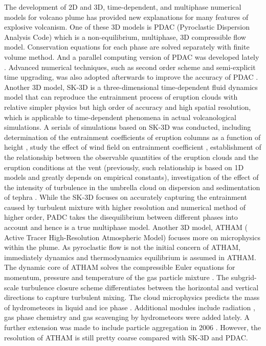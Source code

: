 \documentclass[journal abbreviation, manuscript]{copernicus}
\begin{document}
The development of 2D and 3D, time-dependent, and multiphase numerical models for volcano plume has provided new explanations for many features of explosive volcanism. One of these 3D models is PDAC (Pyroclastic Dispersion Analysis Code) \citep{neri2003multiparticle}  which is a non-equilibrium, multiphase, 3D compressible flow model. Conservation equations for each phase are solved separately with finite volume method. And a parallel computing version of PDAC was developed lately \citep{ongaro2007parallel}. Advanced numerical techniques, such as second order scheme and semi-explicit time upgrading, was also adopted afterwards to improve the accuracy of PDAC \citep{carcano2013semi}. 
Another 3D model, SK-3D \citep{suzuki2005numerical} is a three-dimensional time-dependent fluid dynamics model that can reproduce the entrainment process of eruption clouds with relative simpler physics but high order of accuracy and high spatial resolution, which is applicable to time-dependent phenomena in actual volcanological simulations. 
A serials of simulations based on SK-3D was conducted, including determination of the entrainment coefficients of eruption columns as a function of height \citep{suzuki2010numerical}, study the effect of wind field on entrainment coefficient \citep{suzuki20133d}, establishment of the relationship between the observable quantities of the eruption clouds and the eruption conditions at the vent \citep{suzuki2009three} (previously, such relationship is based on 1D models and greatly depends on empirical constants), investigation of the effect of the intensity of turbulence in the umbrella cloud on dispersion and sedimentation of tephra \citep{koyaguchi2009effect}. 
While the SK-3D focuses on accurately capturing the entrainment caused by turbulent mixture with higher resolution and numerical method of higher order, PADC takes the disequilibrium between different phases into account and hence is a true multiphase model. Another 3D model, ATHAM ( Active Tracer High-Resolution Atmospheric Model) \citep{oberhuber1998volcanic} focuses more on microphysics within the plume. As pyroclastic flow is not the initial concern of ATHAM, immediately dynamics and thermodynamics equilibrium is assumed in ATHAM. The dynamic core of ATHAM solves the compressible Euler equations for momentum, pressure and temperature of the gas particle mixture \citep{oberhuber1998volcanic}. The subgrid-scale turbulence closure scheme differentiates between the horizontal and vertical directions \citep{herzog2003prognostic} to capture turbulent mixing. The cloud microphysics predicts the mass of hydrometeors in liquid and ice phase \citep{herzog1998effect}. Additional modules include radiation \citep{langmann1997radiative}, gas phase chemistry \citep{trentmann2002simulation} and gas scavenging by hydrometeors \citep{textor2003injection} were added lately. A further extension was made to include particle aggregation in 2006 \citep{textor2006volcanic1, textor2006volcanic2}. However, the resolution of ATHAM is still pretty coarse compared with SK-3D and PDAC.
\end{document}
